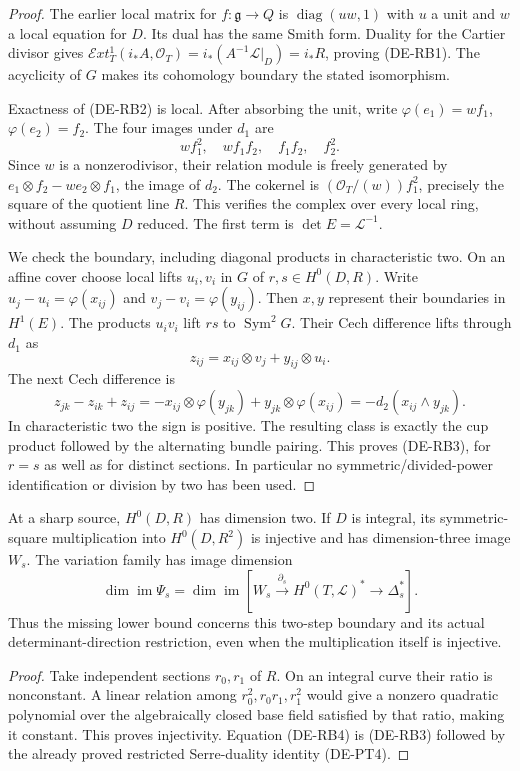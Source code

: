 \begin{proof}
The earlier local matrix for $f:\mathfrak g\to Q$ is
$\operatorname{diag}(uw,1)$ with $u$ a unit and $w$ a local
equation for $D$. Its dual has the same Smith form. Duality for
the Cartier divisor gives
$\mathcal E xt^1_T(i_*A,\mathcal O_T)=i_*(A^{-1}\mathcal L|_D)
=i_*R$, proving (DE-RB1). The acyclicity of $G$ makes its
cohomology boundary the stated isomorphism.

Exactness of (DE-RB2) is local. After absorbing the unit, write
$\varphi(e_1)=wf_1$, $\varphi(e_2)=f_2$. The four images under
$d_1$ are
\[
wf_1^2,\quad wf_1f_2,\quad f_1f_2,\quad f_2^2.
\]
Since $w$ is a nonzerodivisor, their relation module is freely
generated by $e_1\otimes f_2-w e_2\otimes f_1$, the image
of $d_2$. The cokernel is $(\mathcal O_T/(w))f_1^2$, precisely
the square of the quotient line $R$. This verifies the complex
over every local ring, without assuming $D$ reduced. The first
term is $\det E=\mathcal L^{-1}$.

We check the boundary, including diagonal products in
characteristic two. On an affine cover choose local lifts
$u_i,v_i$ in $G$ of $r,s\in H^0(D,R)$. Write
$u_j-u_i=\varphi(x_{ij})$ and
$v_j-v_i=\varphi(y_{ij})$. Then $x,y$ represent their
boundaries in $H^1(E)$. The products $u_iv_i$ lift $rs$ to
$\operatorname{Sym}^2G$. Their Cech difference lifts through
$d_1$ as
\[
z_{ij}=x_{ij}\otimes v_j+y_{ij}\otimes u_i.
\]
The next Cech difference is
\[
z_{jk}-z_{ik}+z_{ij}
=-x_{ij}\otimes\varphi(y_{jk})
  +y_{jk}\otimes\varphi(x_{ij})
=-d_2(x_{ij}\wedge y_{jk}).
\]
In characteristic two the sign is positive. The resulting
class is exactly the cup product followed by the alternating
bundle pairing. This proves (DE-RB3), for $r=s$ as well as
for distinct sections. In particular no symmetric/divided-power
identification or division by two has been used.
\end{proof}

\begin{corollary}
\label{cor:DE-A3-residual-pencil-restriction}
At a sharp source, $H^0(D,R)$ has dimension two. If $D$ is
integral, its symmetric-square multiplication into $H^0(D,R^2)$
is injective and has dimension-three image $W_s$.
The variation family has image dimension
\[
\dim\operatorname{im}\Psi_s
=\dim\operatorname{im}
\left[W_s\xrightarrow{\partial_s}H^0(T,\mathcal L)^*
\longrightarrow\Delta_s^*\right].
\tag{DE-RB4}
\]
Thus the missing lower bound concerns this two-step boundary
and its actual determinant-direction restriction, even when
the multiplication itself is injective.
\end{corollary}
\begin{proof}
Take independent sections $r_0,r_1$ of $R$. On an integral
curve their ratio is nonconstant. A linear relation among
$r_0^2,r_0r_1,r_1^2$ would give a nonzero quadratic polynomial
over the algebraically closed base field satisfied by that
ratio, making it constant. This proves injectivity.
Equation (DE-RB4) is (DE-RB3) followed by the already proved
restricted Serre-duality identity (DE-PT4).
\end{proof}

